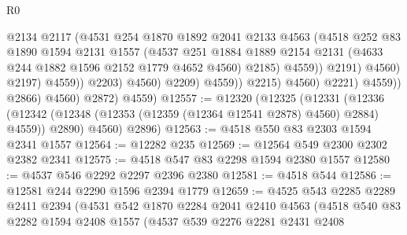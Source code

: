 \begin{lexlean}{R0}
\begin{coremodule}
                                          @2134
                                          @2117
                                          (@4531
                                            @254
                                            @1870
                                            @1892
                                            @2041
                                            @2133
                                            @4563
                                            (@4518
                                              @252
                                              @83
                                              @1890
                                              @1594
                                              @2131
                                              @1557
                                              (@4537
                                                @251
                                                @1884
                                                @1889
                                                @2154
                                                @2131
                                                (@4633 @244 @1882 @1596 @2152 @1779 @4652 @4560)
                                                @2185)
                                              @4559))
                                          @2191)
                                        @4560)
                                      @2197)
                                    @4559))
                                @2203)
                              @4560)
                            @2209)
                          @4559))
                      @2215)
                    @4560)
                  @2221)
                @4559))
            @2866)
          @4560)
        @2872)
      @4559)
@12557 := @12320
    (@12325
      (@12331
        (@12336 (@12342 (@12348 (@12353 (@12359 (@12364 @12541 @2878) @4560) @2884) @4559)) @2890)
        @4560)
      @2896)
@12563 := @4518 @550 @83 @2303 @1594 @2341 @1557
@12564 := @12282 @235
@12569 := @12564 @549 @2300 @2302 @2382 @2341
@12575 := @4518 @547 @83 @2298 @1594 @2380 @1557
@12580 := @4537 @546 @2292 @2297 @2396 @2380
@12581 := @4518 @544
@12586 := @12581 @244 @2290 @1596 @2394 @1779
@12659 := @4525
    @543
    @2285
    @2289
    @2411
    @2394
    (@4531
      @542
      @1870
      @2284
      @2041
      @2410
      @4563
      (@4518
        @540
        @83
        @2282
        @1594
        @2408
        @1557
        (@4537
          @539
          @2276
          @2281
          @2431
          @2408

\end{coremodule}
\end{lexlean}
